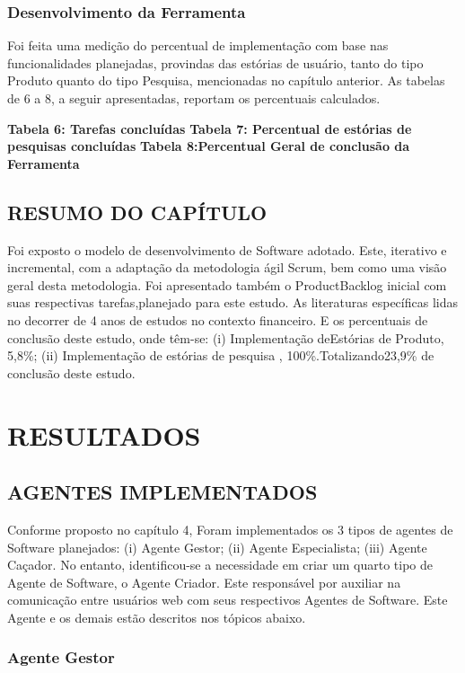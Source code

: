 \subsection{Desenvolvimento da Ferramenta}
Foi feita uma medição do percentual de implementação com base nas funcionalidades planejadas, provindas das estórias de usuário, tanto do tipo Produto quanto do tipo Pesquisa, mencionadas no capítulo anterior. As tabelas de 6 a 8, a seguir apresentadas, reportam os percentuais calculados.

\textbf{Tabela 6: Tarefas concluídas}
\textbf{Tabela 7: Percentual de estórias de pesquisas concluídas}
\textbf{Tabela 8:Percentual Geral de conclusão da Ferramenta}

\section{RESUMO DO CAPÍTULO}
Foi exposto o modelo de desenvolvimento de Software adotado. Este, iterativo e incremental, com a adaptação da metodologia ágil Scrum, bem como uma visão geral desta metodologia. Foi apresentado também o ProductBacklog inicial com suas respectivas tarefas,planejado para este estudo. As literaturas específicas lidas no decorrer de 4 anos de estudos no contexto financeiro. E os percentuais de conclusão deste estudo, onde têm-se: (i) Implementação deEstórias de Produto, 5,8\%; (ii) Implementação de estórias de pesquisa , 100\%.Totalizando23,9\% de conclusão deste estudo.


\newpage
\chapter{RESULTADOS}
\section{AGENTES IMPLEMENTADOS}

Conforme proposto no capítulo 4, Foram implementados os 3 tipos de agentes de Software planejados: (i) Agente Gestor; (ii) Agente Especialista; (iii) Agente Caçador. No entanto, identificou-se a necessidade em criar um quarto tipo de Agente de Software, o Agente Criador. Este responsável por auxiliar na comunicação entre usuários web com seus respectivos Agentes de Software. Este Agente e os demais estão descritos nos tópicos abaixo.

\subsection{Agente Gestor}

